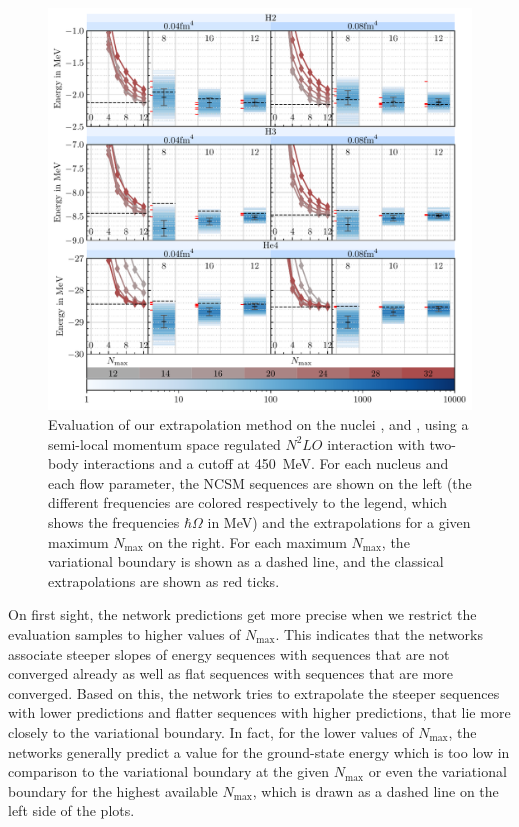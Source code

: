\begin{figure}[H]
  \centering
  \includegraphics[width=\textwidth]{media/vanilla_evaluation.pdf}
  \caption{Evaluation of our extrapolation method on the nuclei ,  and , using a semi-local momentum space regulated $N^{2}LO$ interaction with two-body interactions and a cutoff at \SI{450}{\mega\electronvolt}. For each nucleus and each flow parameter, the NCSM sequences are shown on the left (the different frequencies are colored respectively to the legend, which shows the frequencies $\hbar\Omega$ in \si[]{\mega\electronvolt}) and the extrapolations for a given maximum $N_\mathrm{max}$ on the right. For each maximum $N_\mathrm{max}$, the variational boundary is shown as a dashed line, and the classical extrapolations are shown as red ticks.}
  \label{fig:eval_vanilla}
\end{figure}

On first sight, the network predictions get more precise when we restrict the evaluation samples to higher values of $N_\mathrm{max}$. This indicates that the networks associate steeper slopes of energy sequences with sequences that are not converged already as well as flat sequences with sequences that are more converged. Based on this, the network tries to extrapolate the steeper sequences with lower predictions and flatter sequences with higher predictions, that lie more closely to the variational boundary. In fact, for the lower values of $N_\mathrm{max}$, the networks generally predict a value for the ground-state energy which is too low in comparison to the variational boundary at the given $N_\mathrm{max}$ or even the variational boundary for the highest available $N_\mathrm{max}$, which is drawn as a dashed line on the left side of the plots.

